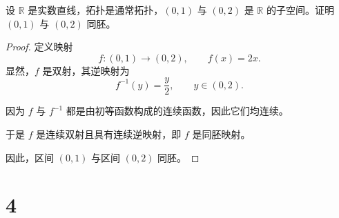 \begin{homework}
[11] 设 $\mathbb{R}$ 是实数直线，拓扑是通常拓扑，$(0,1)$ 与 $(0,2)$ 是 $\mathbb{R}$ 的子空间。证明 $(0,1)$ 与 $(0,2)$ 同胚。
\end{homework}
\begin{proof}
定义映射
\[
f:(0,1)\to(0,2),\qquad f(x)=2x.
\]
显然，$f$ 是双射，其逆映射为
\[
f^{-1}(y)=\frac{y}{2}, \qquad y\in(0,2).
\]

因为 $f$ 与 $f^{-1}$ 都是由初等函数构成的连续函数，因此它们均连续。

于是 $f$ 是连续双射且具有连续逆映射，即 $f$ 是同胚映射。

因此，区间 $(0,1)$ 与区间 $(0,2)$ 同胚。
\end{proof}
\chapter{4}
